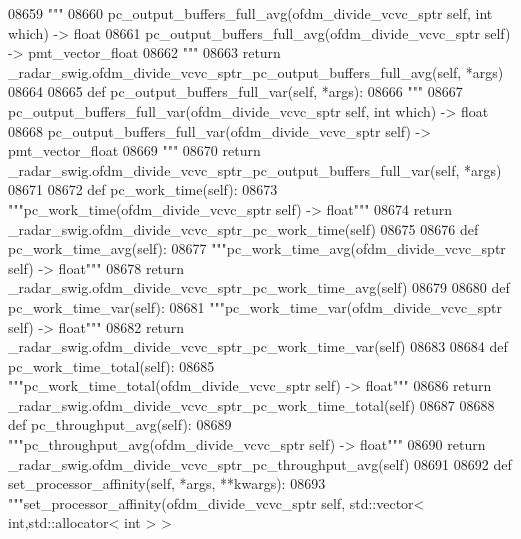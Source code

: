 \begin{DoxyCode}
{{{{{{{{{{{{{{{{{{{{{{{{{{{{08659         \textcolor{stringliteral}{"""}
08660 \textcolor{stringliteral}{        pc\_output\_buffers\_full\_avg(ofdm\_divide\_vcvc\_sptr self, int which) -> float}
08661 \textcolor{stringliteral}{        pc\_output\_buffers\_full\_avg(ofdm\_divide\_vcvc\_sptr self) -> pmt\_vector\_float}
08662 \textcolor{stringliteral}{        """}
08663         \textcolor{keywordflow}{return} \_radar\_swig.ofdm\_divide\_vcvc\_sptr\_pc\_output\_buffers\_full\_avg(self, *args)
08664 
08665     \textcolor{keyword}{def }pc_output_buffers_full_var(self, *args):
08666         \textcolor{stringliteral}{"""}
08667 \textcolor{stringliteral}{        pc\_output\_buffers\_full\_var(ofdm\_divide\_vcvc\_sptr self, int which) -> float}
08668 \textcolor{stringliteral}{        pc\_output\_buffers\_full\_var(ofdm\_divide\_vcvc\_sptr self) -> pmt\_vector\_float}
08669 \textcolor{stringliteral}{        """}
08670         \textcolor{keywordflow}{return} \_radar\_swig.ofdm\_divide\_vcvc\_sptr\_pc\_output\_buffers\_full\_var(self, *args)
08671 
08672     \textcolor{keyword}{def }pc_work_time(self):
08673         \textcolor{stringliteral}{"""pc\_work\_time(ofdm\_divide\_vcvc\_sptr self) -> float"""}
08674         \textcolor{keywordflow}{return} \_radar\_swig.ofdm\_divide\_vcvc\_sptr\_pc\_work\_time(self)
08675 
08676     \textcolor{keyword}{def }pc_work_time_avg(self):
08677         \textcolor{stringliteral}{"""pc\_work\_time\_avg(ofdm\_divide\_vcvc\_sptr self) -> float"""}
08678         \textcolor{keywordflow}{return} \_radar\_swig.ofdm\_divide\_vcvc\_sptr\_pc\_work\_time\_avg(self)
08679 
08680     \textcolor{keyword}{def }pc_work_time_var(self):
08681         \textcolor{stringliteral}{"""pc\_work\_time\_var(ofdm\_divide\_vcvc\_sptr self) -> float"""}
08682         \textcolor{keywordflow}{return} \_radar\_swig.ofdm\_divide\_vcvc\_sptr\_pc\_work\_time\_var(self)
08683 
08684     \textcolor{keyword}{def }pc_work_time_total(self):
08685         \textcolor{stringliteral}{"""pc\_work\_time\_total(ofdm\_divide\_vcvc\_sptr self) -> float"""}
08686         \textcolor{keywordflow}{return} \_radar\_swig.ofdm\_divide\_vcvc\_sptr\_pc\_work\_time\_total(self)
08687 
08688     \textcolor{keyword}{def }pc_throughput_avg(self):
08689         \textcolor{stringliteral}{"""pc\_throughput\_avg(ofdm\_divide\_vcvc\_sptr self) -> float"""}
08690         \textcolor{keywordflow}{return} \_radar\_swig.ofdm\_divide\_vcvc\_sptr\_pc\_throughput\_avg(self)
08691 
08692     \textcolor{keyword}{def }set_processor_affinity(self, *args, **kwargs):
08693         \textcolor{stringliteral}{"""set\_processor\_affinity(ofdm\_divide\_vcvc\_sptr self, std::vector< int,std::allocator< int > >
}}}}}}}}}}}}}}}}}}}}}}}}}}}}}
\end{DoxyCode}
